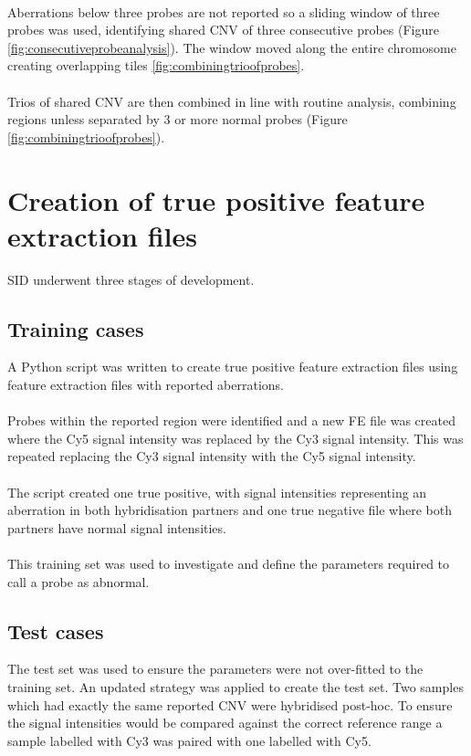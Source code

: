 \paragraph*{}
Aberrations below three probes are not reported so a sliding window of three probes was used, identifying shared CNV of three consecutive probes (Figure \ref{fig:consecutiveprobeanalysis}). The window moved along the entire chromosome creating overlapping tiles \ref{fig:combiningtrioofprobes}.

\paragraph*{}
Trios of shared CNV are then combined in line with routine analysis, combining regions unless separated by 3 or more normal probes (Figure \ref{fig:combiningtrioofprobes}).
\section{Creation of true positive feature extraction files}
SID underwent three stages of development.
\subsection{Training cases}
A Python script was written to create true positive feature extraction files using feature extraction files with reported aberrations. 
\paragraph*{}
Probes within the reported region were identified and a new FE file was created where the Cy5 signal intensity was replaced by the Cy3 signal intensity. This was repeated replacing the Cy3 signal intensity with the Cy5 signal intensity.
\paragraph*{}
The script created one true positive, with signal intensities representing an aberration in both hybridisation partners and one true negative file where both partners have normal signal intensities.
\paragraph*{}
This training set was used to investigate and define the parameters required to call a probe as abnormal. 
\subsection{Test cases}
The test set was used to ensure the parameters were not over-fitted to the training set. An updated strategy was applied to create the test set. Two samples which had exactly the same reported CNV were hybridised post-hoc. 
To ensure the signal intensities would be compared against the correct reference range a sample labelled with Cy3 was paired with one labelled with Cy5. 
